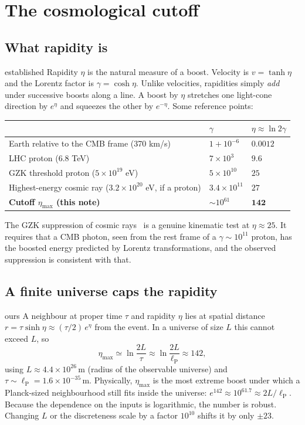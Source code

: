 \documentclass[11pt,a4paper]{article}
\newcommand{\tagbox}[2]{\textsf{\scriptsize\colorbox{#1!12}{\textcolor{#1!70!black}{#2}}}}
\newcommand{\est}{\tagbox{gray}{established}}
\newcommand{\ours}{\tagbox{orange}{ours}}
\newcommand{\lP}{\ell_{\mathrm P}}
\begin{document}
\section{The cosmological cutoff}
\subsection{What rapidity is}
\est{} Rapidity $\eta$ is the natural measure of a boost. Velocity is $v=\tanh\eta$ and the Lorentz factor is $\gamma=\cosh\eta$. Unlike velocities, rapidities simply \emph{add} under successive boosts along a line. A boost by $\eta$ stretches one light-cone direction by $e^{\eta}$ and squeezes the other by $e^{-\eta}$. Some reference points:
\begin{center}\small
\begin{tabular}{@{}lll@{}}
\toprule
 & $\gamma$ & $\eta\approx\ln 2\gamma$ \\
\midrule
Earth relative to the CMB frame (370 km/s) & $1+10^{-6}$ & $0.0012$\\
LHC proton (6.8 TeV) & $7\times10^{3}$ & $9.6$\\
GZK threshold proton ($5\times10^{19}$ eV) & $5\times10^{10}$ & $25$\\
Highest-energy cosmic ray ($3.2\times10^{20}$ eV, if a proton) & $3.4\times10^{11}$ & $27$\\
\textbf{Cutoff $\eta_{\max}$ (this note)} & $\sim10^{61}$ & $\mathbf{142}$\\
\bottomrule
\end{tabular}
\end{center}
The GZK suppression of cosmic rays~\cite{CG99} is a genuine kinematic test at $\eta\approx25$. It requires that a CMB photon, seen from the rest frame of a $\gamma\sim10^{11}$ proton, has the boosted energy predicted by Lorentz transformations, and the observed suppression is consistent with that.

\subsection{A finite universe caps the rapidity}
\ours{} A neighbour at proper time $\tau$ and rapidity $\eta$ lies at spatial distance $r=\tau\sinh\eta\approx(\tau/2)\,e^{\eta}$ from the event. In a universe of size $L$ this cannot exceed $L$, so
\begin{equation}
\eta_{\max}\simeq\ln\frac{2L}{\tau}\approx\ln\frac{2L}{\lP}\approx142,
\end{equation}
using $L\approx4.4\times10^{26}$\,m (radius of the observable universe) and $\tau\sim\lP=1.6\times10^{-35}$\,m. Physically, $\eta_{\max}$ is the most extreme boost under which a Planck-sized neighbourhood still fits inside the universe: $e^{142}\approx10^{61.7}\approx2L/\lP$. Because the dependence on the inputs is logarithmic, the number is robust. Changing $L$ or the discreteness scale by a factor $10^{10}$ shifts it by only $\pm23$.
\end{document}

